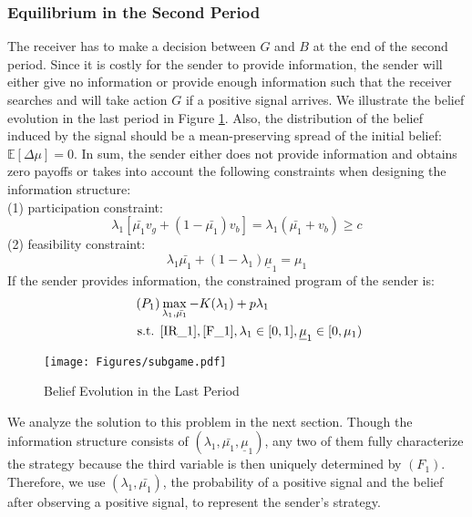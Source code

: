 \documentclass[11pt]{extarticle}
\begin{document}
\subsubsection{Equilibrium in the Second Period}\label{eq_subgame}
The receiver has to make a decision between $G$ and $B$ at the end of the second period. Since it is costly for the sender to provide information, the sender will either give no information or provide enough information such that the receiver searches and will take action $G$ if a positive signal arrives. We illustrate the belief evolution in the last period in Figure \ref{subgame}. Also, the distribution of the belief induced by the signal should be a mean-preserving spread of the initial belief: $\mathbb{E}[\Delta \mu]=0$. In sum, the sender either does not provide information and obtains zero payoffs or takes into account the following constraints when designing the information structure:\\
(1) participation constraint:
\begin{equation}\label{IR_1}
\lambda_1 [\bar{\mu_1} v_g + (1 - \bar{\mu_1})v_b] = \lambda_1 (\bar{\mu_1} + v_b) \geq c \tag{$IR_1$}
\end{equation}
(2)  feasibility constraint:
\begin{equation}\label{F_1}
\lambda_1 \bar{\mu_1} + (1-\lambda_1) \underline{\mu}_1 = \mu_1 \tag{$F_1$}
\end{equation}
If the sender provides information, the constrained program of the sender is:
\begin{align}\tag{$P_1$} \label{P1}
& \max\limits_{\lambda_1, \bar{\mu_1}} -K(\lambda_1) + p \lambda_1 \nonumber\\
\text{s.t. } &\eqref{IR_1},\eqref{F_1}, \lambda_1 \in [0,1],\underline{\mu}_1  \in [0,\mu_1) \nonumber
\end{align}

\begin{figure}[h!]
	\centering
	\texttt{[image: Figures/subgame.pdf]}
	\caption{Belief Evolution in the Last Period}
	\label{subgame}
\end{figure}

We analyze the solution to this problem in the next section. Though the information structure consists of $(\lambda_1, \bar{\mu_1}, \underline{\mu}_1)$, any two of them fully characterize the strategy because the third variable is then uniquely determined by $(F_1)$. Therefore, we use $(\lambda_1, \bar{\mu_1})$, the probability of a positive signal and the belief after observing a positive signal, to represent the sender's strategy.
\end{document}
